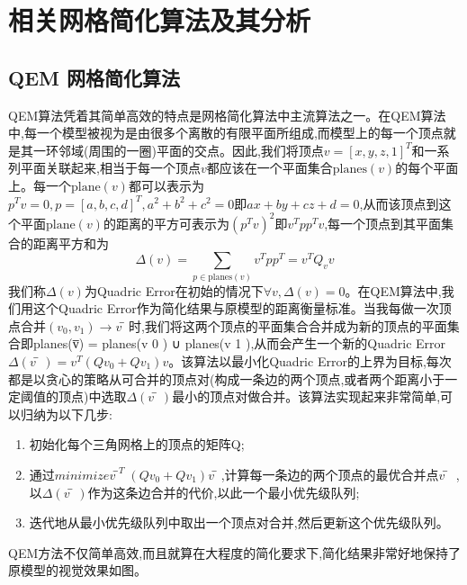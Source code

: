 
\chapter{相关网格简化算法及其分析}
\section{QEM 网格简化算法}
QEM算法凭着其简单高效的特点是网格简化算法中主流算法之一。在QEM算法中,每一个模型被视为是由很多个离散的有限平面所组成,而模型上的每一个顶点就是其一环邻域(周围的一圈)平面的交点。因此,我们将顶点$v=[x,y,z,1]^T$和一系列平面关联起来,相当于每一个顶点$v$都应该在一个平面集合$\text{planes}(v)$的每个平面上。每一个$\text{plane}(v)$都可以表示为$p^Tv=0,p=[a,b,c,d]^T,a^2+b^2+c^2=0即ax+by+cz+d=0$,从而该顶点到这个平面$\text{plane}(v)$的距离的平方可表示为$(p^Tv)^2$即$v^Tpp^Tv$,每一个顶点到其平面集合的距离平方和为
\begin{equation}
  \Delta(v) = \sum_{p\in \text{planes}(v)}v^Tpp^T = v^TQ_vv
\end{equation}
我们称$\Delta(v)$为Quadric Error在初始的情况下$\forall v,\Delta(v)=0$。在QEM算法中,我们用这个Quadric
Error作为简化结果与原模型的距离衡量标准。当我每做一次顶点合并$(v_0, v_1) \to v̅$时,我们将这两个顶点的平面集合合并成为新的顶点的平面集合即planes(v̅) = planes(v 0 ) ∪ planes(v 1 ),从而会产生一个新的Quadric Error$\Delta(v̅)=v^T(Qv_0+Qv_1)v$。该算法以最小化Quadric Error的上界为目标,每次都是以贪心的策略从可合并的顶点对(构成一条边的两个顶点,或者两个距离小于一定阈值的顶点)中选取$\Delta(v̅)$最小的顶点对做合并。该算法实现起来非常简单,可以归纳为以下几步:
\begin{enumerate}
  \item 初始化每个三角网格上的顶点的矩阵Q;
  \item 通过$minimize v̅^T(Qv_0+Qv_1)v̅$,计算每一条边的两个顶点的最优合并点$v̅$ ,以$\Delta(v̅)$作为这条边合并的代价,以此一个最小优先级队列;
  \item 迭代地从最小优先级队列中取出一个顶点对合并,然后更新这个优先级队列。
\end{enumerate}
QEM方法不仅简单高效,而且就算在大程度的简化要求下,简化结果非常好地保持了原模型的视觉效果如图。
